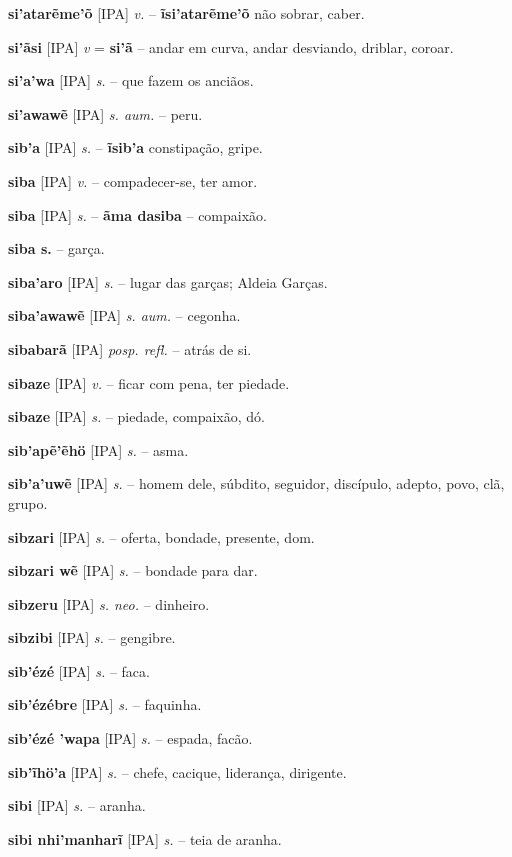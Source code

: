 \textbf{si'atarẽme'õ} [IPA] \textit{v.} -- \textbf{ĩsi'atarẽme'õ} não sobrar, caber.

\textbf{si'ãsi} [IPA] \textit{v} = \textbf{si'ã} -- andar em curva, andar desviando, driblar, coroar.

\textbf{si'a'wa} [IPA] \textit{s.} -- que fazem os anciãos.

\textbf{si'awawẽ} [IPA] \textit{s. aum.} -- peru.

\textbf{sib'a} [IPA] \textit{s.} -- \textbf{ĩsib'a} constipação, gripe.

\textbf{siba} [IPA] \textit{v.} -- compadecer-se, ter amor.

\textbf{siba} [IPA] \textit{s.} -- \textbf{ãma dasiba} -- compaixão.

\textbf{siba s.} -- garça.

\textbf{siba'aro} [IPA] \textit{s.} -- lugar das garças; Aldeia Garças.

\textbf{siba'awawẽ} [IPA] \textit{s. aum.} -- cegonha.

\textbf{sibabarã} [IPA] \textit{posp. refl.} -- atrás de si.

\textbf{sibaze} [IPA] \textit{v.} -- ficar com pena, ter piedade.

\textbf{sibaze} [IPA] \textit{s.} -- piedade, compaixão, dó.

\textbf{sib'apẽ'ẽhö} [IPA] \textit{s.} -- asma.

\textbf{sib'a'uwẽ} [IPA] \textit{s.} -- homem dele, súbdito, seguidor, discípulo, adepto, povo, clã, grupo.

\textbf{sibzari} [IPA] \textit{s.} -- oferta, bondade, presente, dom.

\textbf{sibzari wẽ} [IPA] \textit{s.} -- bondade para dar.

\textbf{sibzeru} [IPA] \textit{s. neo.} -- dinheiro.

\textbf{sibzibi} [IPA] \textit{s.} -- gengibre.

\textbf{sib'ézé} [IPA] \textit{s.} -- faca.

\textbf{sib'ézébre} [IPA] \textit{s.} -- faquinha.

\textbf{sib'ézé 'wapa} [IPA] \textit{s.} -- espada, facão.

\textbf{sib'ĩhö'a} [IPA] \textit{s.} -- chefe, cacique, liderança, dirigente.

\textbf{sibi} [IPA] \textit{s.} -- aranha.

\textbf{sibi nhi'manharĩ} [IPA] \textit{s.} -- teia de aranha.

